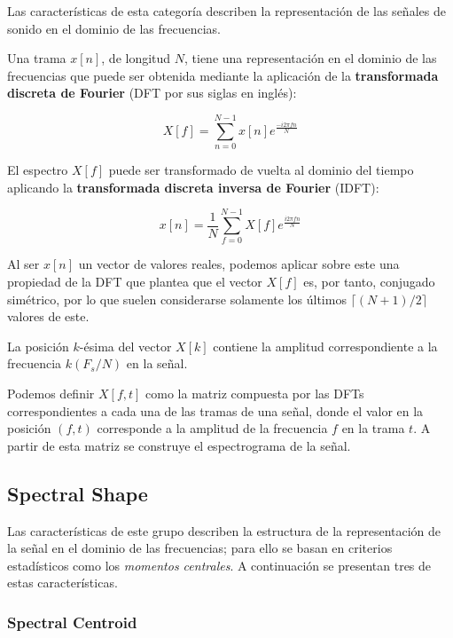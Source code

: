 Las características de esta categoría describen la representación de las señales de sonido en el dominio de las frecuencias.

Una trama $x[n]$, de longitud $N$, tiene una representación en el dominio de las frecuencias que puede ser obtenida mediante la aplicación de la \textbf{transformada discreta de Fourier} (DFT por sus siglas en inglés):

\begin{equation}
    \label{eq:DFT}
    X[f] = \sum_{n=0}^{N-1}{x[n]e^{\frac{-i2\pi fn}{N}}}
\end{equation}

El espectro $X[f]$ puede ser transformado de vuelta al dominio del tiempo aplicando la \textbf{transformada discreta inversa de Fourier} (IDFT):

\begin{equation}
    \label{eq:IDFT}
    x[n] = \frac{1}{N}\sum_{f=0}^{N-1}{X[f]e^{\frac{i2\pi fn}{N}}}
\end{equation}

Al ser $x[n]$ un vector de valores reales, podemos aplicar sobre este una propiedad de la DFT que plantea que el vector $X[f]$ es, por tanto, conjugado simétrico, por lo que suelen considerarse solamente los últimos $\lceil (N+1)/2 \rceil$ valores de este.

La posición $k$-ésima del vector $X[k]$ contiene la amplitud correspondiente a la frecuencia $k(F_s/N)$ en la señal.

Podemos definir $X[f,t]$ como la matriz compuesta por las DFTs correspondientes a cada una de las tramas de una señal, donde el valor en la posición $(f, t)$ corresponde a la amplitud de la frecuencia $f$ en la trama $t$.
A partir de esta matriz se construye el espectrograma de la señal.

\subsection{Spectral Shape}\label{subsec:spectralShape}

Las características de este grupo describen la estructura de la representación de la señal en el dominio de las frecuencias;
para ello se basan en criterios estadísticos como los \textit{momentos centrales}.
A continuación se presentan tres de estas características.

\subsubsection{Spectral Centroid}


